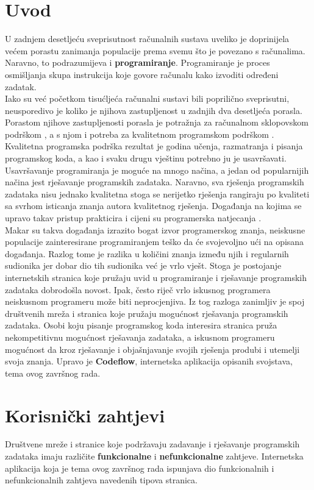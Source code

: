 \documentclass[times, utf8, zavrsni, numeric]{fer}
\begin{document}
	\chapter{Uvod}
	U zadnjem desetljeću sveprisutnost računalnih sustava uveliko je doprinijela većem porastu zanimanja populacije prema svemu što je povezano s računalima.  Naravno, to podrazumijeva i  \textbf{programiranje}. Programiranje je proces osmišljanja skupa instrukcija koje govore računalu kako izvoditi određeni zadatak.\\
	Iako su već početkom tisućljeća računalni sustavi bili poprilično sveprisutni, neusporedivo je koliko je njihova zastupljenost u zadnjih dva desetljeća porasla. Porastom njihove zastupljenosti porasla je potražnja za računalnom sklopovskom podrškom , a s njom i potreba za kvalitetnom programskom podrškom . Kvalitetna programska podrška rezultat je godina učenja, razmatranja i pisanja programskog koda, a kao i svaku drugu vještinu potrebno ju je usavršavati. Usavršavanje programiranja je moguće na mnogo načina, a jedan od popularnijih načina jest rješavanje programskih zadataka. Naravno, sva rješenja programskih zadataka nisu jednako kvalitetna stoga se nerijetko rješenja rangiraju po kvaliteti sa svrhom isticanja znanja autora kvalitetnog rješenja. Događanja na kojima se upravo takav pristup prakticira i cijeni su programerska natjecanja .\\
	Makar su takva događanja izrazito bogat izvor programerskog znanja, neiskusne populacije zainteresirane programiranjem teško da će svojevoljno ući na opisana događanja. Razlog tome je razlika u količini znanja između njih i regularnih sudionika jer dobar dio tih sudionika već je vrlo vješt. Stoga je postojanje internetskih stranica koje pružaju uvid u programiranje i rješavanje programskih zadataka dobrodošla novost. Ipak, često riječ vrlo iskusnog programera neiskusnom programeru može biti neprocjenjiva. Iz tog razloga zanimljiv je spoj društvenih mreža  i stranica koje pružaju mogućnost rješavanja programskih zadataka. Osobi koju pisanje programskog koda interesira stranica pruža nekompetitivnu mogućnost rješavanja zadataka, a iskusnom programeru mogućnost da kroz rješavanje i objašnjavanje svojih rješenja produbi i utemelji svoja znanja. Upravo je \textbf{Codeflow}, internetska aplikacija opisanih svojstava, tema ovog završnog rada.
	
	\chapter{Korisnički zahtjevi}
	\label{cha:zahtjevi}
	Društvene mreže i stranice koje podržavaju zadavanje i rješavanje programskih zadataka imaju različite \textbf{funkcionalne} i \textbf{nefunkcionalne} zahtjeve. Internetska aplikacija koja je tema ovog završnog rada ispunjava dio funkcionalnih i nefunkcionalnih zahtjeva navedenih tipova stranica.
	
\end{document}
